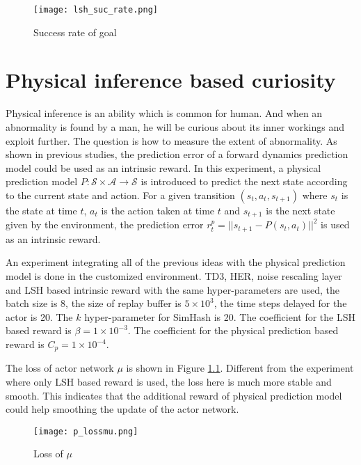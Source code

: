 \documentclass[a4paper, 12pt]{report}
\begin{document}
        \begin{figure}[H]
        \centering
        \texttt{[image: lsh\_suc\_rate.png]}
        \caption{Success rate of goal}
        \end{figure}

\chapter {Physical inference based curiosity}

Physical inference is an ability which is common for human. And when an abnormality is found by a man, he will be curious about its inner workings and exploit further. The question is how to measure the extent of abnormality. As shown in previous studies, the prediction error of a forward dynamics prediction model could be used as an intrinsic reward\cite{4141061}. In this experiment, a physical prediction model $P:\mathcal S\times \mathcal A\to \mathcal S$ is introduced to predict the next state according to the current state and action. For a given transition $(s_t,a_t,s_{t+1})$ where $s_t$ is the state at time $t$, $a_t$ is the action taken at time $t$ and $s_{t+1}$ is the next state given by the environment, the prediction error $r^p_t = ||s_{t+1} - P(s_t, a_t)||^2$ is used as an intrinsic reward.

An experiment integrating all of the previous ideas with the physical prediction model is done in the customized environment. TD3, HER, noise rescaling layer and LSH based intrinsic reward with the same hyper-parameters are used, the batch size is 8, the size of replay buffer is $5\times 10^3$, the time steps delayed for the actor is 20. The $k$ hyper-parameter for SimHash is 20. The coefficient for the LSH based reward is $\beta=1\times 10^{-3}$. The coefficient for the physical prediction based reward is $C_p=1\times 10^{-4}$.

The loss of actor network $\mu$ is shown in Figure \ref{p_lossmu}. Different from the experiment where only LSH based reward is used, the loss here is much more stable and smooth. This indicates that the additional reward of physical prediction model could help smoothing the update of the actor network.

        \begin{figure}[H]
        \centering
        \texttt{[image: p\_lossmu.png]}
        \caption{Loss of $\mu$}
            \label{p_lossmu}
        \end{figure}
\end{document}
